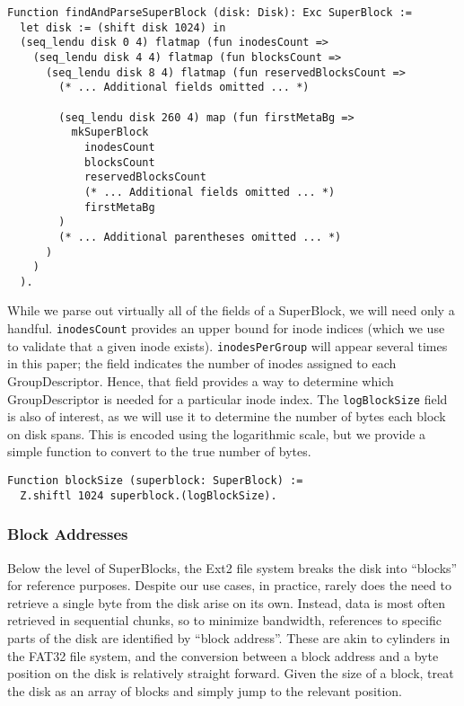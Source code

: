 \documentclass[nocopyrightspace]{sigplanconf}
\begin{document}
\begin{lstlisting}
Function findAndParseSuperBlock (disk: Disk): Exc SuperBlock :=
  let disk := (shift disk 1024) in
  (seq_lendu disk 0 4) flatmap (fun inodesCount =>
    (seq_lendu disk 4 4) flatmap (fun blocksCount =>
      (seq_lendu disk 8 4) flatmap (fun reservedBlocksCount =>
        (* ... Additional fields omitted ... *)

        (seq_lendu disk 260 4) map (fun firstMetaBg =>
          mkSuperBlock
            inodesCount
            blocksCount
            reservedBlocksCount
            (* ... Additional fields omitted ... *)
            firstMetaBg
        )
        (* ... Additional parentheses omitted ... *)
      )
    )
  ).
\end{lstlisting}

While we parse out virtually all of the fields of a SuperBlock, we will need
only a handful. {\tt inodesCount} provides an upper bound for inode indices
(which we use to validate that a given inode exists). {\tt inodesPerGroup}
will appear several times in this paper; the field indicates the number of
inodes assigned to each GroupDescriptor. Hence, that field provides a way to
determine which GroupDescriptor is needed for a particular inode index. The
{\tt logBlockSize} field is also of interest, as we will use it to determine
the number of bytes each block on disk spans. This is encoded using the
logarithmic scale, but we provide a simple function to convert to the true
number of bytes.

\begin{lstlisting}
Function blockSize (superblock: SuperBlock) := 
  Z.shiftl 1024 superblock.(logBlockSize).
\end{lstlisting}

\subsubsection{Block Addresses}

Below the level of SuperBlocks, the Ext2 file system breaks the disk into
``blocks'' for reference purposes. Despite our use cases, in practice, rarely
does the need to retrieve a single byte from the disk arise on its own.
Instead, data is most often retrieved in sequential chunks, so to minimize
bandwidth, references to specific parts of the disk are identified by ``block
address''. These are akin to cylinders in the FAT32 file system, and the
conversion between a block address and a byte position on the disk is
relatively straight forward. Given the size of a block, treat the disk as an
array of blocks and simply jump to the relevant position.
\end{document}
